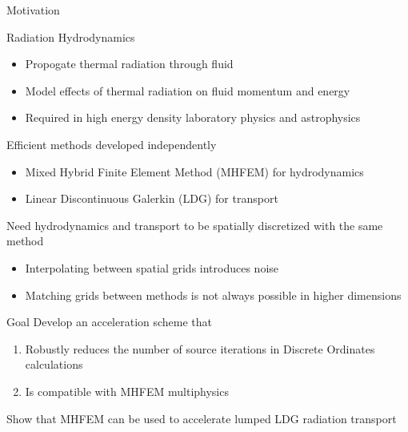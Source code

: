 \documentclass[10pt]{beamer}
\begin{document}
\begin{frame}{Motivation}

	\footnotesize
	Radiation Hydrodynamics 
	\vspace{-.1in}
	    \begin{itemize}
            \item Propogate thermal radiation through fluid 
	    	\item Model effects of thermal radiation on fluid momentum and energy 
	    	\item Required in high energy density laboratory physics and astrophysics 
	    \end{itemize}
    \vspace{-.05in}

   	Efficient methods developed independently 
    \vspace{-.1in}
    \begin{itemize}
        \item Mixed Hybrid Finite Element Method (MHFEM) for hydrodynamics 
        \item Linear Discontinuous Galerkin (LDG) for transport 
    \end{itemize}
    \vspace{-0.05in}

    Need hydrodynamics and transport to be spatially discretized with the same method 
    \vspace{-.1in}
    \begin{itemize}
        \item Interpolating between spatial grids introduces noise 
        \item Matching grids between methods is not always possible in higher dimensions 
    \end{itemize}

    \begin{block}{Goal}
        Develop an acceleration scheme that 
            \begin{enumerate} \vspace{-.1in}
                \item Robustly reduces the number of source iterations in Discrete Ordinates calculations 
                \item Is compatible with MHFEM multiphysics 
            \end{enumerate}
        \vspace{-.05in}
       	Show that MHFEM can be used to accelerate lumped LDG radiation transport 
    \end{block}

\end{frame}
\end{document}
